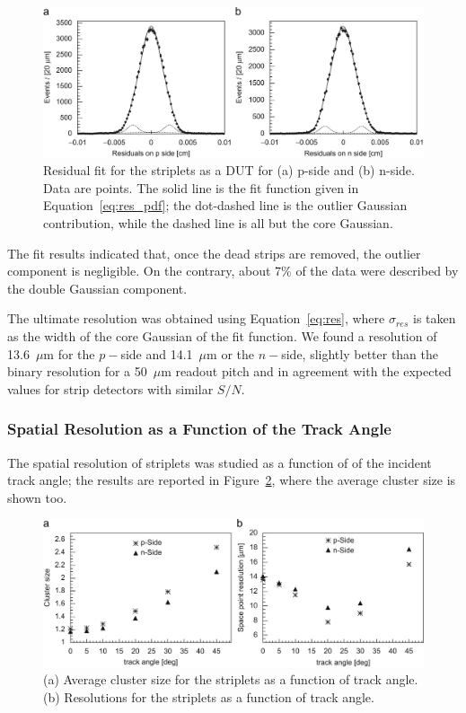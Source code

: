 \begin{figure}
\centering
\includegraphics[width=1.0\textwidth]{striplets_residuals.jpg}
\caption{\label{fig:striplets_residuals}Residual fit for the striplets as a DUT for (a) p-side and (b) n-side. Data are points.  The solid  line 
is the   fit function  given in Equation~\ref{eq:res_pdf}; the dot-dashed line is the outlier Gaussian 
contribution, while the dashed line is all but the core Gaussian.}
\end{figure}

The fit results indicated that, once the dead strips are removed, the outlier component is negligible. 
On the contrary, about 7\% of the data were described by the double Gaussian component.

The ultimate resolution was obtained using Equation~\ref{eq:res}, where $\sigma_{res}$ is taken as 
the width of the core Gaussian of the fit function. We found a resolution of 
13.6~$\mu$m for the $p-$side and 14.1~$\mu$m or the $n-$side, slightly better than the binary  
resolution for a 50~$\mu$m readout pitch and in agreement with the expected values for strip detectors with similar $S/N$.

\subsubsection{Spatial Resolution as a Function of the Track Angle}

The spatial resolution of striplets was studied as a function of of the incident track angle; 
the results are reported in Figure~\ref{fig:cluster_rotation}, where the average cluster size 
is shown too.

\begin{figure}[!htbp]
\centering
\includegraphics[width=1.0\textwidth]{cluster_rotation.jpg}
\caption{\label{fig:cluster_rotation}(a) Average cluster size for the striplets as a function of track angle. (b) Resolutions for the striplets as a function of track angle.}
\end{figure}

